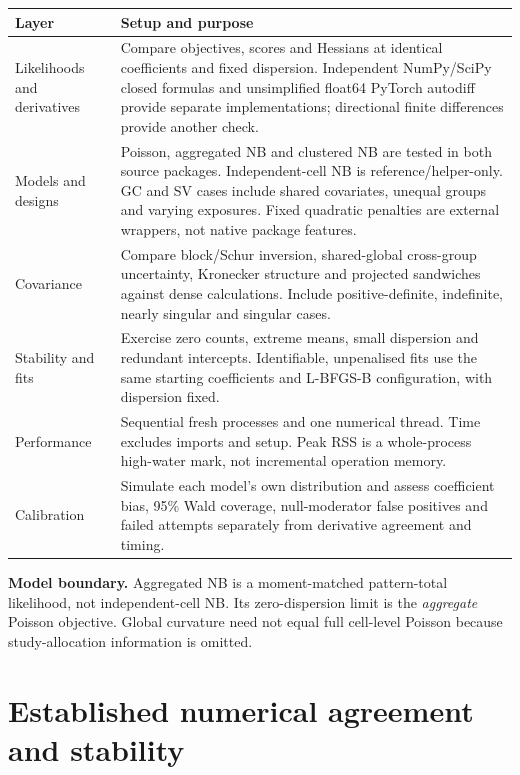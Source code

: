 \documentclass[11pt,a4paper]{article}
\begin{document}
\begin{center}\small
\begin{tabularx}{\textwidth}{>{\raggedright\arraybackslash}p{}T}
\toprule
Layer & Setup and purpose\\
\midrule
Likelihoods and derivatives &
Compare objectives, scores and Hessians at identical coefficients and fixed
dispersion. Independent NumPy/SciPy closed formulas and unsimplified float64
PyTorch autodiff provide separate implementations; directional finite
differences provide another check.\\
Models and designs &
Poisson, aggregated NB and clustered NB are tested in both source packages.
Independent-cell NB is reference/helper-only. GC and SV cases include shared
covariates, unequal groups and varying exposures. Fixed quadratic penalties
are external wrappers, not native package features.\\
Covariance &
Compare block/Schur inversion, shared-global cross-group uncertainty, Kronecker
structure and projected sandwiches against dense calculations. Include
positive-definite, indefinite, nearly singular and singular cases.\\
Stability and fits &
Exercise zero counts, extreme means, small dispersion and redundant intercepts.
Identifiable, unpenalised fits use the same starting coefficients and L-BFGS-B
configuration, with dispersion fixed.\\
Performance &
Sequential fresh processes and one numerical thread. Time excludes imports
and setup. Peak RSS is a whole-process high-water mark, not incremental
operation memory.\\
Calibration &
Simulate each model's own distribution and assess coefficient bias, 95\% Wald
coverage, null-moderator false positives and failed attempts separately from
derivative agreement and timing.\\
\bottomrule
\end{tabularx}
\end{center}
\noindent\textbf{Model boundary.}
Aggregated NB is a moment-matched pattern-total likelihood, not independent-cell
NB. Its zero-dispersion limit is the \emph{aggregate} Poisson objective.
Global curvature need not equal full cell-level Poisson because study-allocation
information is omitted.

\clearpage
\section{Established numerical agreement and stability}
\end{document}

